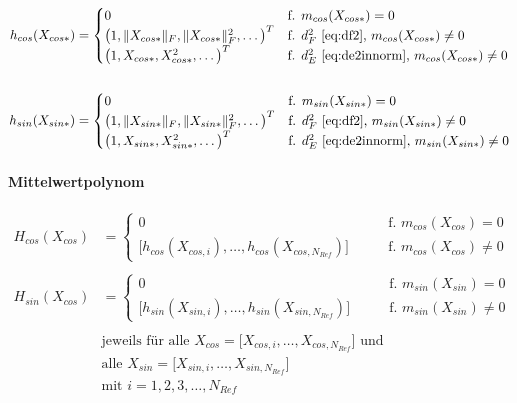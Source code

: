 \begin{align}\label{eq:hfun}
	h_{cos}(X_{cos*}) &=
		\begin{cases}
			0								                          & \text{f. } m_{cos}(X_{cos*}) = 0 \\
			\big( 1, \|X_{cos*}\|_F, \|X_{cos*}\|_F^2, \ldots \big)^T & \text{f. } d_F^2 \text{ \eqref{eq:df2}, }       m_{cos}(X_{cos*}) \ne 0 \\
			\big( 1, X_{cos*}, X_{cos*}^2, \ldots \big)^T             & \text{f. } d_E^2 \text{ \eqref{eq:de2innorm}, } m_{cos}(X_{cos*}) \ne 0
		\end{cases} \nonumber \\
	\\
	h_{sin}(X_{sin*}) &=
		\begin{cases}
			0								                          & \text{f. } m_{sin}(X_{sin*}) = 0 \\
			\big( 1, \|X_{sin*}\|_F, \|X_{sin*}\|_F^2, \ldots \big)^T & \text{f. } d_F^2 \text{ \eqref{eq:df2}, }       m_{sin}(X_{sin*}) \ne 0 \\
			\big( 1, X_{sin*}, X_{sin*}^2, \ldots \big)^T             & \text{f. } d_E^2 \text{ \eqref{eq:de2innorm}, } m_{sin}(X_{sin*}) \ne 0
		\end{cases} \nonumber
\end{align}


\paragraph*{Mittelwertpolynom}


\begin{align}\label{eq:hmatrix}
	H_{cos}(X_{cos}) &=
		\begin{cases}
			0 															   &\qquad \text{f. } m_{cos}(X_{cos}) = 0 \\
			\big[ h_{cos}(X_{cos,i}),\ldots,h_{cos}(X_{cos,N_{Ref}}) \big] &\qquad \text{f. } m_{cos}(X_{cos}) \ne 0
		\end{cases} \nonumber \\
	\\
	H_{sin}(X_{cos}) &=
		\begin{cases}
			0															   &\qquad \text{f. } m_{sin}(X_{sin}) = 0 \\
			\big[ h_{sin}(X_{sin,i}),\ldots,h_{sin}(X_{sin,N_{Ref}}) \big] &\qquad \text{f. } m_{sin}(X_{sin}) \ne 0
		\end{cases} \nonumber \\
	\nonumber \\
	& \text{jeweils für alle } X_{cos} = \big[ X_{cos,i},\dots, X_{cos,N_{Ref}} \big] \text{ und } \nonumber \\
	& \text{alle } X_{sin} = \big[ X_{sin,i},\dots, X_{sin,N_{Ref}} \big] \nonumber \\
	& \text{mit } i = 1,2,3,\ldots,N_{Ref} \nonumber
\end{align}


